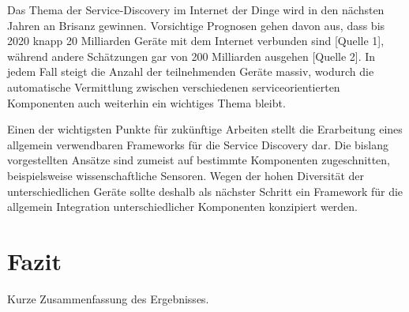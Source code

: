 \documentclass[conference,compsoc]{IEEEtran}
\begin{document}
Das Thema der Service-Discovery im Internet der Dinge wird in den nächsten Jahren an Brisanz gewinnen. Vorsichtige Prognosen gehen davon aus, dass bis 2020 knapp 20 Milliarden Geräte mit dem Internet verbunden sind [Quelle 1], während andere Schätzungen gar von 200 Milliarden ausgehen [Quelle 2]. In jedem Fall steigt die Anzahl der teilnehmenden Geräte massiv, wodurch die automatische Vermittlung zwischen verschiedenen serviceorientierten Komponenten auch weiterhin ein wichtiges Thema bleibt.

Einen der wichtigsten Punkte für zukünftige Arbeiten stellt die Erarbeitung eines allgemein verwendbaren Frameworks für die Service Discovery dar. Die bislang vorgestellten Ansätze sind zumeist auf bestimmte Komponenten zugeschnitten, beispielsweise wissenschaftliche Sensoren. Wegen der hohen Diversität der unterschiedlichen Geräte sollte deshalb als nächster Schritt ein Framework für die allgemein Integration unterschiedlicher Komponenten konzipiert werden.



\section{Fazit}
Kurze Zusammenfassung des Ergebnisses.


%
%

\end{document}
